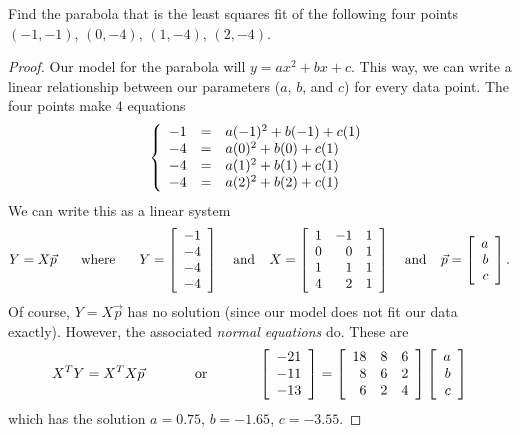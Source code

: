 \documentclass{tutorial}
\begin{document}
\begin{prob}
Find the parabola that is the least squares fit of the following four points $(-1,-1)$, $(0,-4)$, $(1,-4)$, $(2,-4)$.
\end{prob} \ifsolns \begin{proof}
Our model for the parabola will $y = ax^2 + bx + c$. This way, we can write a linear relationship between our parameters ($a$, $b$, and $c$) for every data point. The four points make $4$ equations
\[
  \left\{ \begin{array}{rcl}
    -1 & = & a(-1)^2 + b(-1) + c(1) \\
    -4 & = & a(0)^2 + b(0) + c(1) \\
    -4 & = & a(1)^2 + b(1) + c(1) \\
    -4 & = & a(2)^2 + b(2) + c(1)
  \end{array} \right.
\]
We can write this as a linear system
\[
  Y = X\vec{p}
  \hspace{0.25in} \text{where} \hspace{0.25in}
  Y = \left[ \begin{array}{r} -1 \\ -4 \\ -4 \\ -4 \end{array} \right]
  \hspace{0.15in} \text{and} \hspace{0.15in}
  X = \left[ \begin{array}{rrr}
     1 & -1 &  1 \\
     0 &  0 &  1 \\
     1 &  1 &  1 \\
     4 &  2 &  1
  \end{array} \right]
  \hspace{0.15in} \text{and} \hspace{0.15in}
  \vec{p} = \left[ \begin{array}{r} a \\ b \\ c \end{array} \right] .
\]
Of course, $Y=X\vec{p}$ has no solution (since our model does not fit our data exactly). However, the associated \emph{normal equations} do. These are
\[
  X^T Y = X^TX\vec{p}
  \hspace{0.5in} \text{or} \hspace{0.5in}
  \left[ \begin{array}{r}
    -21 \\ -11 \\ -13
  \end{array} \right]
  = \left[ \begin{array}{rrr}
    18 & 8 & 6 \\
    8 & 6 & 2 \\
    6 & 2 & 4
  \end{array} \right] \left[ \begin{array}{r} a \\ b \\ c \end{array} \right]
\]
which has the solution $a = 0.75$, $b = -1.65$, $c = -3.55$.
\end{proof}\else \newpage \fi
\end{document}
